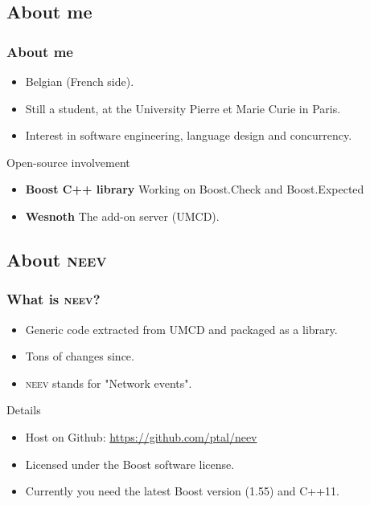 \documentclass[xcolor=dvipsnames]{beamer}
\begin{document}
\subsection{About me}
\begin{frame}
\frametitle{About me}

\begin{itemize}
\item Belgian (French side).
\item Still a student, at the University Pierre et Marie Curie in Paris.
\item Interest in software engineering, language design and concurrency.
\end{itemize}

\begin{block}{Open-source involvement}
\begin{itemize}
\item \textbf{Boost C++ library} Working on Boost.Check and Boost.Expected
\item \textbf{Wesnoth} The add-on server (UMCD).
\end{itemize}
\end{block}
\end{frame}

\subsection{About \textsc{neev}}

\begin{frame}
\frametitle{What is \textsc{neev}?}

\begin{itemize}
\item Generic code extracted from UMCD and packaged as a library.
\item Tons of changes since.
\item \textsc{neev} stands for "Network events".
\end{itemize}

\begin{block}{Details}
\begin{itemize}
\item Host on Github: \url{https://github.com/ptal/neev}
\item Licensed under the Boost software license.
\item Currently you need the latest Boost version (1.55) and C++11.
\end{itemize}
\end{block}
\end{frame}
\end{document}
